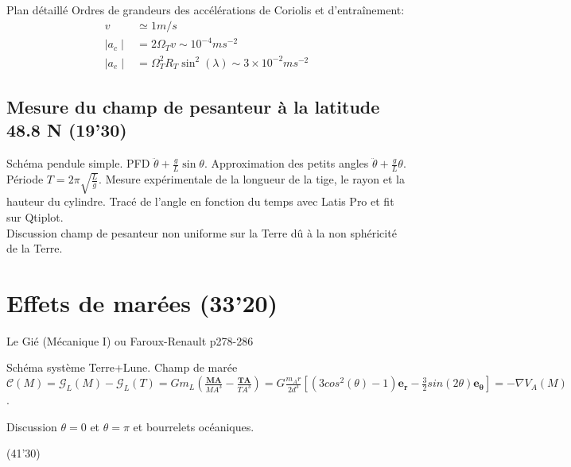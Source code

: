 \begin{reportBlock}{Plan détaillé}
Ordres de grandeurs des accélérations de Coriolis et d'entraînement:
\begin{align}
v & \simeq  1m/s \\
\mid a_c \mid & = 2 \Omega_T v \sim 10^{-4} m s^{-2}   \\
\mid a_e \mid & = \Omega_T^2 R_T \sin^2(\lambda) \sim 3\times10^{-2} m s^{-2}
\end{align}

\subsection{Mesure du champ de pesanteur à la latitude 48.8 N (19'30)}

Schéma pendule simple. PFD $\ddot{\theta} + \frac{g}{L} \sin \theta$. Approximation des petits angles $\ddot{\theta} + \frac{g}{L} \theta$. Période $T = 2\pi\sqrt{\frac{L}{g}}$. Mesure expérimentale de la longueur de la tige, le rayon et la hauteur du cylindre. Tracé de l'angle en fonction du temps avec Latis Pro et fit sur Qtiplot.\\

Discussion champ de pesanteur non uniforme sur la Terre dû à la non sphéricité de la Terre.

\section{Effets de marées (33'20)}
Le Gié (Mécanique I) ou Faroux-Renault p278-286

Schéma système Terre+Lune. Champ de marée $\mathbf{\mathcal{C}}(M) = \mathbf{\mathcal{G}}_L(M) - \mathbf{\mathcal{G}}_L(T) =  G m_L \left( \frac{\mathbf{MA}}{MA^3} - \frac{\mathbf{TA}}{TA^3} \right) = G \frac{m_A r}{2d^3} \left[(3cos^2(\theta) - 1) \mathbf{e_r} - \frac{3}{2} sin(2\theta) \mathbf{e_\theta} \right] = - \nabla V_A(M)$.


Discussion $\theta = 0$ et $\theta = \pi$ et bourrelets océaniques.

(41'30)

\end{reportBlock}


